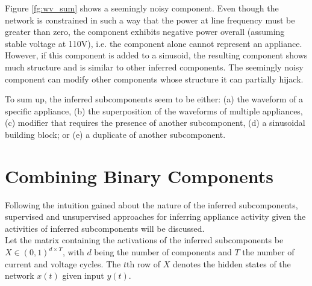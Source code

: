 Figure \ref{fg:wv_sum} shows a seemingly noisy component. Even though the network is constrained in such a way that the power at line frequency must be greater than zero, the component exhibits negative power overall (assuming stable voltage at 110V), i.e. the component alone cannot represent an appliance. However, if this component is added to a sinusoid, the resulting component shows much structure and is similar to other inferred components. The seemingly noisy component can modify other components whose structure it can partially hijack. %

To sum up, the inferred subcomponents seem to be either: (a) the waveform of a specific appliance, (b) the superposition of the waveforms of multiple appliances, (c) modifier that requires the presence of another subcomponent, (d) a sinusoidal building block; or (e) a duplicate of another subcomponent.

\section{Combining Binary Components}
Following the intuition gained about the nature of the inferred subcomponents, supervised and unsupervised approaches for inferring appliance activity given the activities of inferred subcomponents will be discussed.\\
Let the matrix containing the activations of the inferred subcomponents be $X \in (0,1)^{d \times T}$, with $d$ being the number of components and $T$ the number of current and voltage cycles. The $t$th row of $X$ denotes the hidden states of the network $x(t)$ given input $y(t)$.

